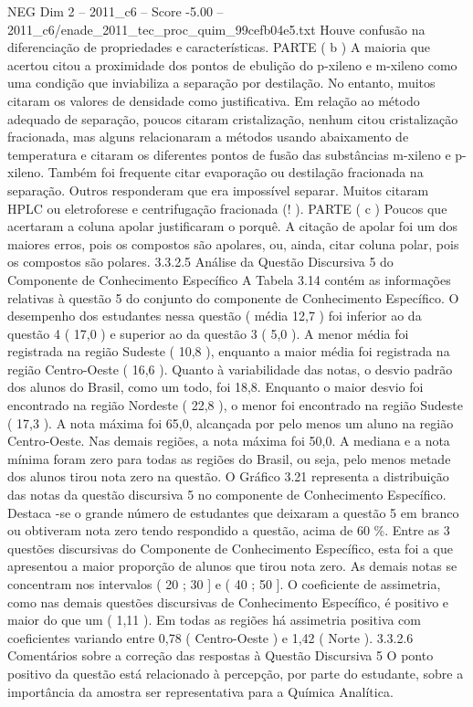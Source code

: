 \begin{textsample}{NEG Dim 2 – 2011\_c6 – Score -5.00 – 2011\_c6/enade\_2011\_tec\_proc\_quim\_99cefb04e5.txt}
Houve confusão na diferenciação de propriedades e características.
PARTE ( b ) A maioria que acertou citou a proximidade dos pontos de ebulição do p-xileno e m-xileno como uma condição que inviabiliza a separação por destilação.
No entanto, muitos citaram os valores de densidade como justificativa.
Em relação ao método adequado de separação, poucos citaram cristalização, nenhum citou cristalização fracionada, mas alguns relacionaram a métodos usando abaixamento de temperatura e citaram os diferentes pontos de fusão das substâncias m-xileno e p-xileno.
Também foi frequente citar evaporação ou destilação fracionada na separação.
Outros responderam que era impossível separar.
Muitos citaram HPLC ou eletroforese e centrifugação fracionada (! ).
PARTE ( c ) Poucos que acertaram a coluna apolar justificaram o porquê.
A citação de apolar foi um dos maiores erros, pois os compostos são apolares, ou, ainda, citar coluna polar, pois os compostos são polares. 3.3.2.5 Análise da Questão Discursiva 5 do Componente de Conhecimento Específico A Tabela 3.14 contém as informações relativas à questão 5 do conjunto do componente de Conhecimento Específico.
O desempenho dos estudantes nessa questão ( média 12,7 ) foi inferior ao da questão 4 ( 17,0 ) e superior ao da questão 3 ( 5,0 ).
A menor média foi registrada na região Sudeste ( 10,8 ), enquanto a maior média foi registrada na região Centro-Oeste ( 16,6 ).
Quanto à variabilidade das notas, o desvio padrão dos alunos do Brasil, como um todo, foi 18,8.
Enquanto o maior desvio foi encontrado na região Nordeste ( 22,8 ), o menor foi encontrado na região Sudeste ( 17,3 ).
A nota máxima foi 65,0, alcançada por pelo menos um aluno na região Centro-Oeste.
Nas demais regiões, a nota máxima foi 50,0.
A mediana e a nota mínima foram zero para todas as regiões do Brasil, ou seja, pelo menos metade dos alunos tirou nota zero na questão.
O Gráfico 3.21 representa a distribuição das notas da questão discursiva 5 no componente de Conhecimento Específico.
Destaca -se o grande número de estudantes que deixaram a questão 5 em branco ou obtiveram nota zero tendo respondido a questão, acima de 60 \%.
Entre as 3 questões discursivas do Componente de Conhecimento Específico, esta foi a que apresentou a maior proporção de alunos que tirou nota zero.
As demais notas se concentram nos intervalos ( 20 ; 30 ] e ( 40 ; 50 ].
O coeficiente de assimetria, como nas demais questões discursivas de Conhecimento Específico, é positivo e maior do que um ( 1,11 ).
Em todas as regiões há assimetria positiva com coeficientes variando entre 0,78 ( Centro-Oeste ) e 1,42 ( Norte ). 3.3.2.6 Comentários sobre a correção das respostas à Questão Discursiva 5 O ponto positivo da questão está relacionado à percepção, por parte do estudante, sobre a importância da amostra ser representativa para a Química Analítica.

\end{textsample}
